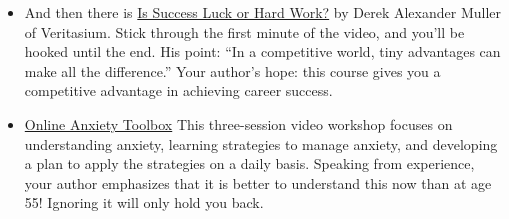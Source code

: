 {\begin{itemize}
\item And then there is \href{https://www.youtube.com/watch?v=3LopI4YeC4I}{Is Success Luck or Hard Work?} by Derek Alexander Muller of Veritasium. Stick through the first minute of the video, and you'll be hooked until the end. His point: ``In a competitive world, tiny advantages can make all the difference.'' Your author's hope: this course gives you a competitive advantage in achieving career success. 


\item \href{https://caps.umich.edu/article/online-anxiety-toolbox}{Online Anxiety Toolbox} This three-session video workshop focuses on understanding anxiety, learning strategies to manage anxiety, and developing a plan to apply the strategies on a daily basis. Speaking from experience, your author emphasizes that it is better to understand this now than at age 55! Ignoring it will only hold you back. 

\end{itemize}
} %

